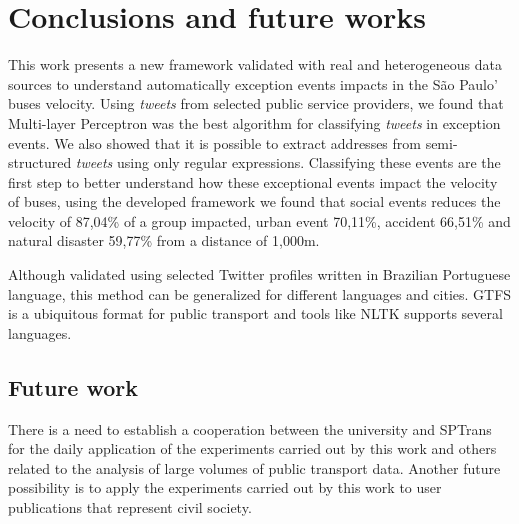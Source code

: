 \documentclass[runningheads]{llncs}
\begin{document}
\section{Conclusions and future works}

This work presents a new framework validated with real and heterogeneous data sources to understand automatically exception events impacts in the São Paulo' buses velocity. Using \textit{tweets} from selected public service providers, we found that Multi-layer Perceptron was the best algorithm for classifying \textit{tweets} in exception events. We also showed that it is possible to extract addresses from semi-structured \textit{tweets} using only regular expressions. Classifying these events are the first step to better understand how these exceptional events impact the velocity of buses, using the developed framework we found that social events reduces the velocity of 87,04\% of a group impacted, urban event 70,11\%, accident 66,51\% and natural disaster 59,77\% from a distance of 1,000m.

Although validated using selected Twitter profiles written in Brazilian Portuguese language, this method can be generalized for different languages and cities. GTFS is a ubiquitous format for public transport and tools like NLTK supports several languages.

\subsection{Future work}

There is a need to establish a cooperation between the university and SPTrans for the daily application of the experiments carried out by this work and others related to the analysis of large volumes of public transport data. Another future possibility is to apply the experiments carried out by this work to user publications that represent civil society.





\end{document}
